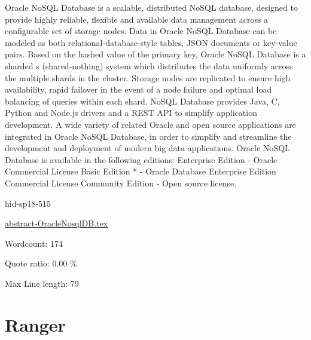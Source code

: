 Oracle NoSQL Database\cite{hid-sp18-515-www-oraclenosql} is a scalable, 
distributed NoSQL database, designed to provide highly reliable, flexible 
and available data management across a configurable set of storage nodes.
Data in Oracle NoSQL Database can be modeled as both relational-database-style 
tables, JSON documents or key-value pairs.
Based on the hashed value of the primary key, Oracle NoSQL Database is 
a sharded s (shared-nothing) system which distributes the data uniformly 
across the multiple shards in the cluster.
Storage nodes are replicated to ensure high availability, rapid failover 
in the event of a node failure and optimal load balancing of queries
within each shard. 
NoSQL Database provides Java, C, Python and Node.js drivers and a 
REST API to simplify application development.
A wide variety of related Oracle and open source applications are 
integrated in Oracle NoSQL Database, in order to simplify and streamline 
the development and deployment of modern big data applications.
Oracle NoSQL Database is available in the following editions: 
Enterprise Edition - Oracle Commercial License
Basic Edition * - Oracle Database Enterprise Edition Commercial 
License
Community Edition - Open source license.


\begin{IU}

hid-sp18-515

\href{https://github.com/cloudmesh-community/hid-sp18-515/blob/master//technology/abstract-OracleNosqlDB.tex}{abstract-OracleNosqlDB.tex}

 

Wordcount: 174


Quote ratio: 0.00 \%
 
Max Line length: 79
\end{IU}

\section{Ranger}

